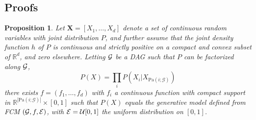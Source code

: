 \documentclass[a4paper, 11pt]{article}
\newtheorem{prop}{Proposition}
\newcommand{\Pa}[1]{\text{Pa}({#1}; \mathcal{G})}
\begin{document}
\subsection{Proofs \label{app:proofs}}

\setcounter{prop}{0}

\begin{prop}
 Let $\textbf{X} = [X_1, \ldots, X_d]$ denote a set of continuous random variables with joint distribution $P$, and further assume that the joint density function $h$ of $P$ is continuous and strictly positive on a compact and convex subset of $\mathbb{R}^{d}$, and zero elsewhere. Letting $\cal G$ be a DAG such that $P$ can be factorized along $\cal G$, 
 $$ P(X) = \prod_i P(X_i | X_{\Pa{i}})$$
 there exists $f = (f_1, \ldots, f_d)$ with $f_i$ a continuous function with compact support in $\mathbb{R}^{|\Pa{i}|}\times [0,1]$ such that $P(X)$ equals the generative model defined from FCM $({\cal G}, f, {\cal E})$, with ${\cal E} = \mathcal{U}[0,1]$ the uniform distribution on $[0,1]$.
\end{prop}
\end{document}
